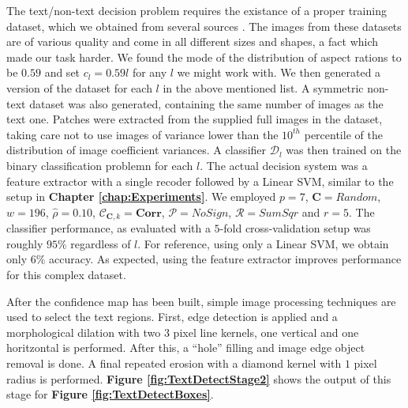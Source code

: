 \documentclass[12pt,a4paper,oneside,english]{UPBThesis}
\begin{document}
The text/non-text decision problem requires the existance of a proper training dataset, which we obtained from several sources \cite{icdar-website,character-recognition-nautral-images,end-to-end-scene-text-recognition}. The images from these datasets are of various quality and come in all different sizes and shapes, a fact which made our task harder. We found the mode of the distribution of aspect rations to be $0.59$ and set $c_l = 0.59l$ for any $l$ we might work with. We then generated a version of the dataset for each $l$ in the above mentioned list. A symmetric non-text dataset was also generated, containing the same number of images as the text one. Patches were extracted from the supplied full images in the dataset, taking care not to use images of variance lower than the $10^{th}$ percentile of the distribution of image coefficient variances. A classifier $\mathcal{D}_l$ was then trained on the binary classification problemn for each $l$. The actual decision system was a feature extractor with a single recoder followed by a Linear SVM, similar to the setup in \textbf{Chapter \ref{chap:Experiments}}. We employed $p = 7$, $\textbf{C} = Random$, $w=196$, $\hat{\rho} = 0.10$, $\mathcal{C}_{\textbf{C},k} = \textbf{Corr}$, $\mathcal{P} = NoSign$, $\mathcal{R} = SumSqr$ and $r=5$. The classifier performance, as evaluated with a $5$-fold cross-validation setup was roughly $95\%$ regardless of $l$. For reference, using only a Linear SVM, we obtain only $6\%$ accuracy. As expected, using the feature extractor improves performance for this complex dataset.

After the confidence map has been built, simple image processing techniques are used to select the text regions. First, edge detection is applied and a morphological dilation with two $3$ pixel line kernels, one vertical and one horitzontal is performed. After this, a ``hole'' filling and image edge object removal is done. A final repeated erosion with a diamond kernel with $1$ pixel radius is performed. \textbf{Figure \ref{fig:TextDetectStage2}} shows the output of this stage for \textbf{Figure \ref{fig:TextDetectBoxes}}.
\end{document}
